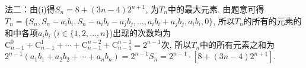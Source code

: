 \begin{question}[points=15]
\begin{solution}
法二：由(i)得$S_n = 8 + (3n-4)2^{n+1}$, 为$T_n$中的最大元素. 由题意可得$T_n = \{S_n, S_n - a_i b_i, S_n - a_i b_i - a_j b_j, \ldots, a_i b_i + a_j b_j, a_i b_i, 0\}$, 所以$T_n$的所有的元素的和中各项$a_i b_i$ ($i \in \{1,2,\ldots,n\}$)出现的次数均为$\mathrm{C}_{n-1}^0 + \mathrm{C}_{n-1}^1 + \cdots + \mathrm{C}_{n-1}^{n-2} + \mathrm{C}_{n-1}^{n-1} = 2^{n-1}$次, 所以$T_n$中的所有元素之和为$2^{n-1} (a_1 b_1 + a_2 b_2 + \cdots + a_n b_n) = 2^{n-1} S_n = 2^{n-1} \cdot [8 + (3n-4)2^{n+1}]$.
\end{solution}
\end{question}

